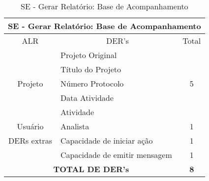    \begin{table}[!h]
    \centering
    \caption{SE - Gerar Relatório: Base de Acompanhamento}
    \label{se_base_acompanhamento}
    \begin{tabular}{|c|l|c|}
    \hline
    \multicolumn{3}{|c|}{SE - Gerar Relatório: Base de Acompanhamento}            \\ \hline
    ALR                      & \multicolumn{1}{c|}{DER's}    & Total              \\ \hline
    \multirow{5}{*}{Projeto} & Projeto Original              & \multirow{5}{*}{5} \\ \cline{2-2}
			    & Título do Projeto             &                    \\ \cline{2-2}
			    & Número Protocolo              &                    \\ \cline{2-2}
			    & Data Atividade                &                    \\ \cline{2-2}
			    & Atividade                     &                    \\ \hline
    Usuário                  & Analista                      & 1                  \\ \hline
    DERs extras              & Capacidade de iniciar ação    & 1                  \\ \hline
    \multicolumn{1}{|l|}{}   & Capacidade de emitir mensagem & 1                  \\ \hline
    \multicolumn{2}{|c|}{\textbf{TOTAL DE DER's}}          & \textbf{8}         \\ \hline
    \end{tabular}
    \end{table}